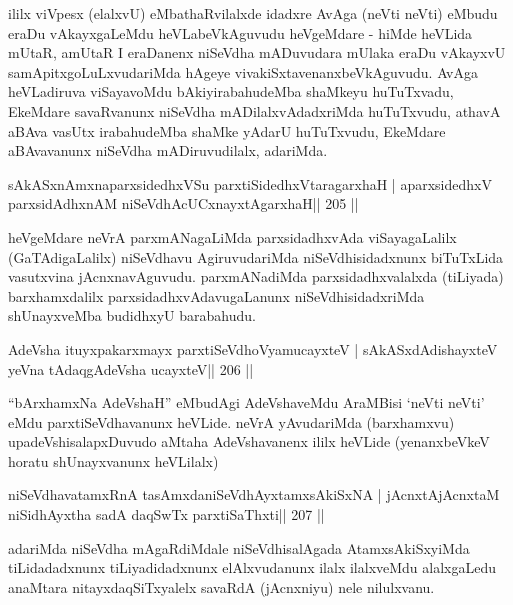 \begin{artha}
ililx viVpesx (elalxvU) eMbathaRvilalxde idadxre AvAga (neVti neVti)
eMbudu eraDu vAkayxgaLeMdu heVLabeVkAguvudu heVgeMdare - hiMde
heVLida mUtaR, amUtaR I eraDanenx niSeVdha mADuvudara mUlaka eraDu
vAkayxvU samApitxgoLuLxvudariMda hAgeye
vivakiSxtavenanxbeVkAguvudu. AvAga heVLadiruva viSayavoMdu
bAkiyirabahudeMba shaMkeyu huTuTxvadu, EkeMdare savaRvanunx niSeVdha
mADilalxvAdadxriMda huTuTxvudu, athavA aBAva vasUtx irabahudeMba
shaMke yAdarU huTuTxvudu, EkeMdare aBAvavanunx
niSeVdha mADiruvudilalx, adariMda.
\end{artha}

\begin{shl}
sAkASxnAmxnaparxsidedhxVSu parxtiSidedhxVtaragarxhaH |
aparxsidedhxV parxsidAdhxnAM niSeVdhAcUCxnayxtAgarxhaH\hfill || 205 ||
\end{shl}

\begin{artha}
heVgeMdare neVrA parxmANagaLiMda parxsidadhxvAda viSayagaLalilx
(GaTAdigaLalilx) niSeVdhavu AgiruvudariMda niSeVdhisidadxnunx
biTuTxLida vasutxvina jAcnxnavAguvudu. parxmANadiMda
parxsidadhxvalalxda (tiLiyada) barxhamxdalilx
parxsidadhxvAdavugaLanunx niSeVdhisidadxriMda shUnayxveMba budidhxyU
barabahudu.
\end{artha}


\begin{shl}
AdeVsha ituyxpakarxmayx parxtiSeVdhoV\s yamucayxteV |
sAkASxdAdishayxteV yeVna tAdaqgAdeVsha ucayxteV\hfill || 206 ||
\end{shl}

\begin{artha}
``bArxhamxNa AdeVshaH'' eMbudAgi AdeVshaveMdu AraMBisi `neVti neVti'
  eMdu parxtiSeVdhavanunx heVLide. neVrA yAvudariMda (barxhamxvu)
  upadeVshisalapxDuvudo aMtaha AdeVshavanenx ililx heVLide (yenanxbeVkeV horatu shUnayxvanunx heVLilalx)
\end{artha}

\begin{shl}
niSeVdhavatamxRnA tasAmxdaniSeVdhAyxtamxsAkiSxNA |
jAcnxtAjAcnxtaM niSidhAyxtha sadA daqSwTx parxtiSaThxti\hfill || 207 ||
\end{shl}

\begin{artha}
adariMda niSeVdha mAgaRdiMdale niSeVdhisalAgada AtamxsAkiSxyiMda tiLidadadxnunx tiLiyadidadxnunx elAlxvudanunx ilalx ilalxveMdu alalxgaLedu anaMtara nitayxdaqSiTxyalelx savaRdA (jAcnxniyu) nele nilulxvanu.
\end{artha}

